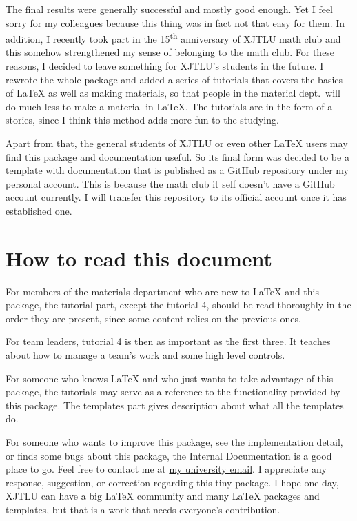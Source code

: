 The final results were generally successful and mostly good enough. Yet I feel sorry for my colleagues because this thing was in fact not that easy for them. In addition, I recently took part in the 15\textsuperscript{th} anniversary of XJTLU math club and this somehow strengthened my sense of belonging to the math club. For these reasons, I decided to leave something for XJTLU's students in the future. I rewrote the whole package and added a series of tutorials that covers the basics of \LaTeX{} as well as making materials, so that people in the material dept.~will do much less to make a material in \LaTeX. The tutorials are in the form of a stories, since I think this method adds more fun to the studying.

Apart from that, the general students of XJTLU or even other \LaTeX{} users may find this package and documentation useful. So its final form was decided to be a template with documentation that is published as a GitHub repository under my personal account. This is because the math club it self doesn't have a GitHub account currently. I will transfer this repository to its official account once it has established one.

\section{How to read this document}
For members of the materials department who are new to \LaTeX{} and this package, the tutorial part, except the tutorial 4, should be read thoroughly in the order they are present, since some content relies on the previous ones.

For team leaders, tutorial 4 is then as important as the first three. It teaches about how to manage a team's work and some high level controls.

For someone who knows \LaTeX{} and who just wants to take advantage of this package, the tutorials may serve as a reference to the functionality provided by this package. The templates part gives description about what all the templates do.

For someone who wants to improve this package, see the implementation detail, or finds some bugs about this package, the Internal Documentation is a good place to go. Feel free to contact me at \href{mailto:guanyuming.he20@student.xjtlu.edu.cn}{my university email}. I appreciate any response, suggestion, or correction regarding this tiny package. I hope one day, XJTLU can have a big \LaTeX{} community and many \LaTeX{} packages and templates, but that is a work that needs everyone's contribution.